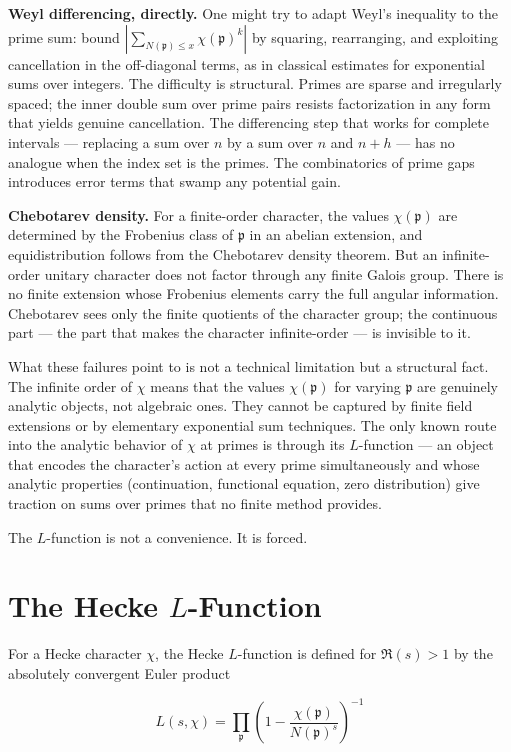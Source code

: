 \documentclass[12pt,a4paper]{article}
\begin{document}
\textbf{Weyl differencing, directly.} One might try to adapt Weyl's inequality to the prime sum: bound $|\sum_{N(\mathfrak{p}) \leq x} \chi(\mathfrak{p})^k|$ by squaring, rearranging, and exploiting cancellation in the off-diagonal terms, as in classical estimates for exponential sums over integers. The difficulty is structural. Primes are sparse and irregularly spaced; the inner double sum over prime pairs resists factorization in any form that yields genuine cancellation. The differencing step that works for complete intervals --- replacing a sum over $n$ by a sum over $n$ and $n+h$ --- has no analogue when the index set is the primes. The combinatorics of prime gaps introduces error terms that swamp any potential gain.

\textbf{Chebotarev density.} For a finite-order character, the values $\chi(\mathfrak{p})$ are determined by the Frobenius class of $\mathfrak{p}$ in an abelian extension, and equidistribution follows from the Chebotarev density theorem. But an infinite-order unitary character does not factor through any finite Galois group. There is no finite extension whose Frobenius elements carry the full angular information. Chebotarev sees only the finite quotients of the character group; the continuous part --- the part that makes the character infinite-order --- is invisible to it.

What these failures point to is not a technical limitation but a structural fact. The infinite order of $\chi$ means that the values $\chi(\mathfrak{p})$ for varying $\mathfrak{p}$ are genuinely analytic objects, not algebraic ones. They cannot be captured by finite field extensions or by elementary exponential sum techniques. The only known route into the analytic behavior of $\chi$ at primes is through its $L$-function --- an object that encodes the character's action at every prime simultaneously and whose analytic properties (continuation, functional equation, zero distribution) give traction on sums over primes that no finite method provides.

The $L$-function is not a convenience. It is forced.

\section{The Hecke $L$-Function}

For a Hecke character $\chi$, the Hecke $L$-function is defined for $\Re(s) > 1$ by the absolutely convergent Euler product

\[
L(s, \chi) = \prod_{\mathfrak{p}} \left(1 - \frac{\chi(\mathfrak{p})}{N(\mathfrak{p})^s}\right)^{-1}
\]
\end{document}
